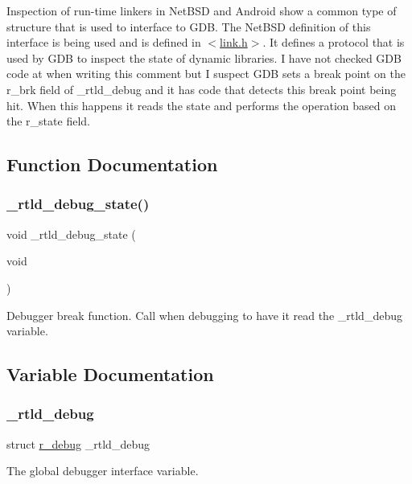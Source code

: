 Inspection of run-\/time linkers in Net\+B\+SD and Android show a common type of structure that is used to interface to G\+DB. The Net\+B\+SD definition of this interface is being used and is defined in $<$\mbox{\hyperlink{link_8h_source}{link.\+h}}$>$. It defines a protocol that is used by G\+DB to inspect the state of dynamic libraries. I have not checked G\+DB code at when writing this comment but I suspect G\+DB sets a break point on the r\+\_\+brk field of \+\_\+rtld\+\_\+debug and it has code that detects this break point being hit. When this happens it reads the state and performs the operation based on the r\+\_\+state field. 

\subsection{Function Documentation}
\mbox{\label{rtl-debugger_8c_a240e0af85abf0e26f425d668dfc0ef3f}} 
\subsubsection{\texorpdfstring{\_rtld\_debug\_state()}{\_rtld\_debug\_state()}}
{\footnotesize\ttfamily void \+\_\+rtld\+\_\+debug\+\_\+state (\begin{DoxyParamCaption}\item[{void}]{ }\end{DoxyParamCaption})}

Debugger break function. Call when debugging to have it read the \+\_\+rtld\+\_\+debug variable. 

\subsection{Variable Documentation}
\mbox{\label{rtl-debugger_8c_af51fdd69058427a602e93792bffc74bd}} 
\subsubsection{\texorpdfstring{\_rtld\_debug}{\_rtld\_debug}}
{\footnotesize\ttfamily struct \mbox{\hyperlink{structr__debug}{r\+\_\+debug}} \+\_\+rtld\+\_\+debug}

The global debugger interface variable. 
